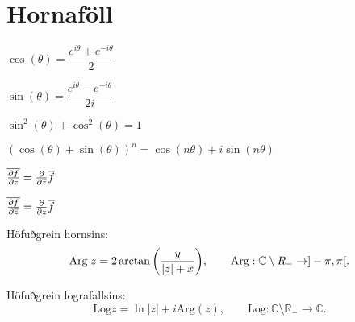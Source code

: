 \noindent
\section*{Hornaföll}

\begin{minipage}{.5\linewidth}
  $\cos(\theta) = \dfrac{e^{i \theta}+e^{-i\theta}}{2}$
\end{minipage}%
\begin{minipage}{.5\linewidth}
	$\sin(\theta) = \dfrac{e^{i \theta}-e^{-i\theta}}{2i}$
\end{minipage}

\begin{minipage}{.5\linewidth}
  $\sin^2(\theta) + \cos^2(\theta) =1$
\end{minipage}%
\begin{minipage}{.5\linewidth}
	$(\cos(\theta)+\sin(\theta))^n = \cos(n\theta)+i\sin(n\theta)$
\end{minipage}

\begin{minipage}{.5\linewidth}
	$\overline {{\frac{\partial f}{\partial z}}} = {\frac{\partial }{\partial \overline z}} \overline{f}$
\end{minipage}%
\begin{minipage}{.5\linewidth}
	$\overline {{\frac{\partial f}{\partial \overline z}}} = {\frac{\partial }{\partial z}} \overline{f}$
\end{minipage}

\begin{minipage}{1\linewidth}
Höfuðgrein hornsins:
\begin{equation*}
  \text{Arg} \; z = 2 \arctan \bigg(\frac{y}{|z| + x} \biggl), \qquad
		  \text{Arg}: {\mathbb C} \setminus R_- \to ]-\pi,\pi[.
\end{equation*}
\end{minipage}
%
\begin{minipage}{1\linewidth}
\noindent Höfuðgrein lografallsins:
\begin{equation*}
      \text{Log} z = \ln |z| + i \text{Arg}(z), \qquad \text{Log}: \mathbb{C} \setminus \mathbb{R_{-}} \to \mathbb{C}.
\end{equation*}
\end{minipage}

